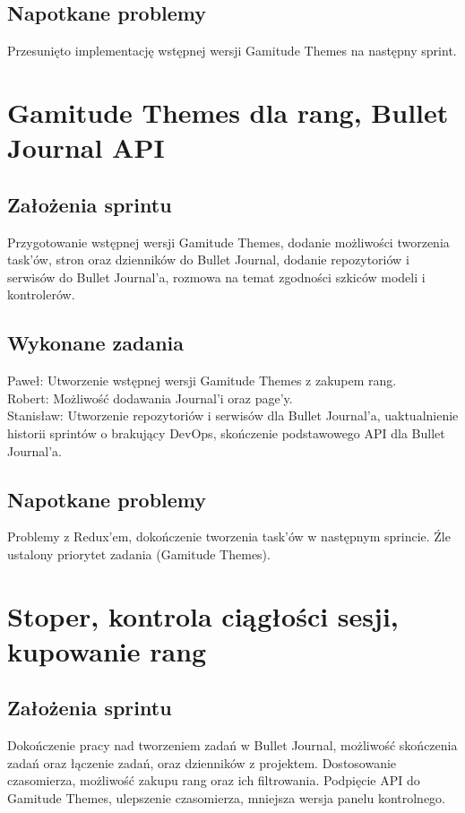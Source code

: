 \documentclass[a4paper,11pt]{report}
\begin{document}
\subsection {Napotkane problemy}
Przesunięto implementację wstępnej wersji Gamitude Themes na następny sprint.

\section {Gamitude Themes dla rang, Bullet Journal API}
\subsection {Założenia sprintu}
Przygotowanie wstępnej wersji Gamitude Themes, dodanie możliwości tworzenia task'ów, stron oraz dzienników do Bullet Journal, dodanie repozytoriów i serwisów do Bullet Journal'a, rozmowa na temat zgodności szkiców modeli i kontrolerów.
\subsection {Wykonane zadania}
Paweł: Utworzenie wstępnej wersji Gamitude Themes z zakupem rang.\\
Robert: Możliwość dodawania Journal'i oraz page'y.\\
Stanisław: Utworzenie repozytoriów i serwisów dla Bullet Journal'a, uaktualnienie historii sprintów o brakujący DevOps, skończenie podstawowego API dla Bullet Journal'a.\\
\subsection {Napotkane problemy}
Problemy z Redux'em, dokończenie tworzenia task'ów w następnym sprincie. Źle ustalony priorytet zadania (Gamitude Themes).

\section {Stoper, kontrola ciągłości sesji, kupowanie rang}
\subsection {Założenia sprintu}
Dokończenie pracy nad tworzeniem zadań w Bullet Journal, możliwość skończenia zadań oraz łączenie zadań, oraz dzienników z projektem. Dostosowanie czasomierza, możliwość zakupu rang oraz ich filtrowania. Podpięcie API do Gamitude Themes, ulepszenie czasomierza, mniejsza wersja panelu kontrolnego.
\end{document}
